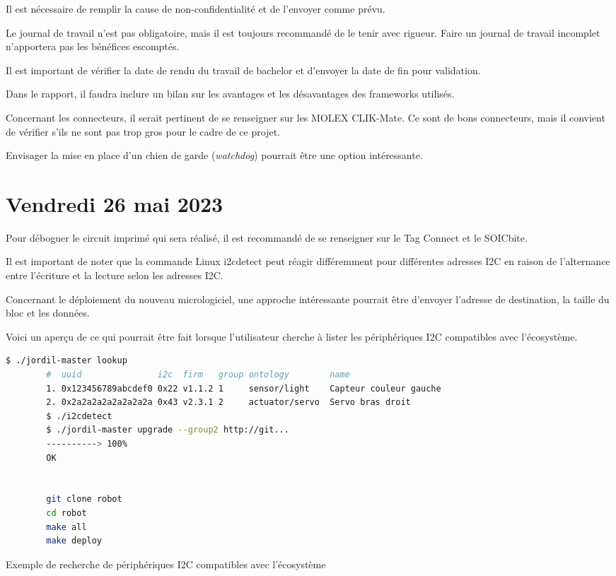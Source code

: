 Il est nécessaire de remplir la cause de non-confidentialité et de l'envoyer comme prévu.

Le journal de travail n'est pas obligatoire, mais il est toujours recommandé de le tenir avec rigueur. Faire un journal de travail incomplet n'apportera pas les bénéfices escomptés.

Il est important de vérifier la date de rendu du travail de bachelor et d'envoyer la date de fin pour validation.

Dans le rapport, il faudra inclure un bilan sur les avantages et les désavantages des \gls{framework}s utilisés.

Concernant les connecteurs, il serait pertinent de se renseigner sur les MOLEX CLIK-Mate. Ce sont de bons connecteurs, mais il convient de vérifier s'ils ne sont pas trop gros pour le cadre de ce projet.

Envisager la mise en place d'un chien de garde (\textit{watchdog}) pourrait être une option intéressante.

\section{Vendredi 26 mai 2023}

Pour déboguer le circuit imprimé qui sera réalisé, il est recommandé de se renseigner sur le Tag Connect et le SOICbite.

Il est important de noter que la commande Linux i2cdetect peut réagir différemment pour différentes adresses I2C en raison de l'alternance entre l'écriture et la lecture selon les adresses I2C.

Concernant le déploiement du nouveau micrologiciel, une approche intéressante pourrait être d'envoyer l'adresse de destination, la taille du bloc et les données.

Voici un aperçu de ce qui pourrait être fait lorsque l'utilisateur cherche à lister les périphériques I2C compatibles avec l'écosystème.

\begin{listing}[!h]
    \begin{lstlisting}[language=bash]
        $ ./jordil-master lookup
        #  uuid               i2c  firm   group ontology        name
        1. 0x123456789abcdef0 0x22 v1.1.2 1     sensor/light    Capteur couleur gauche
        2. 0x2a2a2a2a2a2a2a2a 0x43 v2.3.1 2     actuator/servo  Servo bras droit
        $ ./i2cdetect
        $ ./jordil-master upgrade --group2 http://git... 
        ----------> 100%
        OK
        
        
        git clone robot
        cd robot
        make all
        make deploy
    \end{lstlisting}
    \caption{Exemple de recherche de périphériques I2C compatibles avec l'écosystème}
\end{listing}

